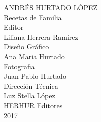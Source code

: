 \begin{titlepage}
  \begin{center}
    \large
    ANDRÉS HURTADO LÓPEZ \\
    \vspace*{3cm}
    \Huge{Recetas de Familia} \\
    \vspace*{3cm}
    \normalsize
    Editor\\
    Liliana Herrera Ramirez\\
    \vspace*{1cm}
    Diseño Gráfico\\
    Ana Maria Hurtado\\
    \vspace*{1cm}
    Fotografia \\
    Juan Pablo Hurtado\\
    \vspace*{1cm}
    Dirección Técnica \\
    Luz Stella López\\
    \vspace*{4.5cm}
    HERHUR Editores\\
    2017\\
  \end{center}
\end{titlepage}